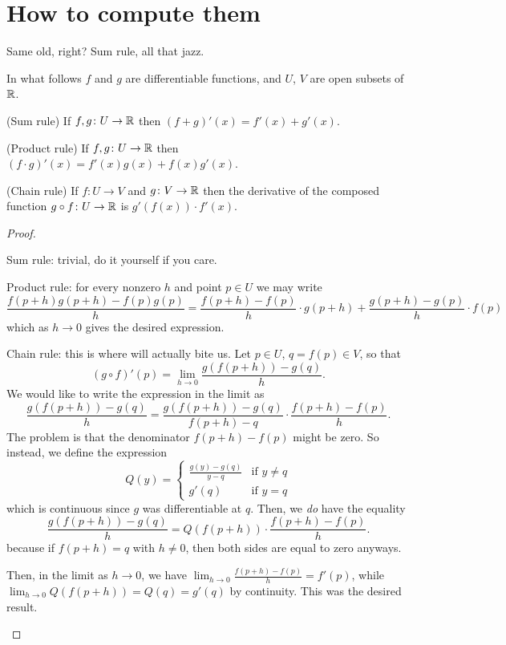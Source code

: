 \section{How to compute them}
Same old, right?
Sum rule, all that jazz.

\begin{theorem}
	In what follows $f$ and $g$ are differentiable functions,
	and $U$, $V$ are open subsets of $\mathbb R$.
	\begin{itemize}
		\ii (Sum rule) If $f,g \colon U \to \mathbb R$
		then $(f+g)'(x) = f'(x) + g'(x)$.

		\ii (Product rule) If $f,g \colon U \to \mathbb R$
		then $(f \cdot g)'(x) = f'(x) g(x) + f(x) g'(x)$.

		\ii (Chain rule) If $f \colon U \to V$ and $g \colon V \to \mathbb R$
		then the derivative of the composed function
		$g \circ f \colon U \to \mathbb R$ is $g'(f(x)) \cdot f'(x)$.
	\end{itemize}
\end{theorem}
\begin{proof}
	\begin{itemize}
	\ii Sum rule: trivial, do it yourself if you care.

	\ii Product rule: for every nonzero $h$ and point $p \in U$
	we may write
	\[
		\frac{f(p+h) g(p+h) - f(p) g(p)}{h}
		= \frac{f(p+h) - f(p)}{h} \cdot g(p+h)
		+ \frac{g(p+h)-g(p)}{h} \cdot f(p)
	\]
	which as $h \to 0$ gives the desired expression.

	\ii Chain rule: this is where \Cref{abuse:limit}
	will actually bite us.
	Let $p \in U$, $q = f(p) \in V$, so that
	\[ (g \circ f)'(p) = \lim_{h \to 0} \frac{g(f(p+h)) - g(q)}{h}. \]
	We would like to write the expression in the limit as
	\[ \frac{g(f(p+h)) - g(q)}{h}
		= \frac{g(f(p+h)) - g(q)}{f(p+h) - q}
		\cdot \frac{f(p+h) - f(p)}{h}. \]
	The problem is that the denominator $f(p+h)-f(p)$ might be zero.
	So instead, we define the expression
	\[
		Q(y) = \begin{cases}
			\frac{g(y) - g(q)}{y - q} & \text{if } y \neq q \\
			g'(q) & \text{if } y = q
		\end{cases}
	\]
	which is continuous since $g$ was differentiable at $q$.
	Then, we \emph{do} have the equality
	\[ \frac{g(f(p+h)) - g(q)}{h}
		= Q\left( f(p+h) \right) \cdot \frac{f(p+h) - f(p)}{h}. \]
	because if $f(p+h) = q$ with $h \neq 0$,
	then both sides are equal to zero anyways.

	Then, in the limit as $h \to 0$,
	we have $\lim_{h \to 0} \frac{f(p+h)-f(p)}{h} = f'(p)$,
	while $\lim_{h \to 0} Q(f(p+h)) = Q(q) = g'(q)$ by continuity.
	This was the desired result. \qedhere
	\end{itemize}
\end{proof}

